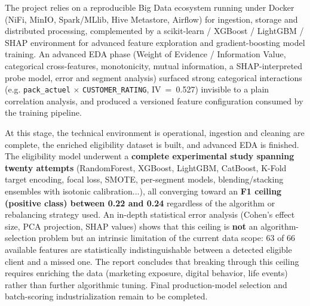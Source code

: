 \documentclass[11pt,a4paper]{report}
\begin{document}
The project relies on a reproducible Big Data ecosystem running under
Docker (NiFi, MinIO, Spark/MLlib, Hive Metastore, Airflow) for ingestion,
storage and distributed processing, complemented by a scikit-learn /
XGBoost / LightGBM / SHAP environment for advanced feature exploration and
gradient-boosting model training. An advanced EDA phase (Weight of
Evidence / Information Value, categorical cross-features, monotonicity,
mutual information, a SHAP-interpreted probe model, error and segment
analysis) surfaced strong categorical interactions (e.g.
\texttt{pack\_actuel} $\times$ \texttt{CUSTOMER\_RATING}, IV~=~0.527)
invisible to a plain correlation analysis, and produced a versioned
feature configuration consumed by the training pipeline.

At this stage, the technical environment is operational, ingestion and
cleaning are complete, the enriched eligibility dataset is built, and
advanced EDA is finished. The eligibility model underwent a
\textbf{complete experimental study spanning twenty attempts}
(RandomForest, XGBoost, LightGBM, CatBoost, K-Fold target encoding, focal
loss, SMOTE, per-segment models, blending/stacking ensembles with
isotonic calibration...), all converging toward an \textbf{F1 ceiling
(positive class) between 0.22 and 0.24} regardless of the algorithm or
rebalancing strategy used. An in-depth statistical error analysis
(Cohen's effect size, PCA projection, SHAP values) shows that this
ceiling is \textbf{not} an algorithm-selection problem but an intrinsic
limitation of the current data scope: 63 of 66 available features are
statistically indistinguishable between a detected eligible client and a
missed one. The report concludes that breaking through this ceiling
requires enriching the data (marketing exposure, digital behavior, life
events) rather than further algorithmic tuning. Final production-model
selection and batch-scoring industrialization remain to be completed.

\tableofcontents
\listoffigures
\listoftables
\end{document}
